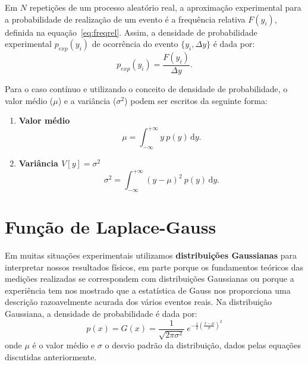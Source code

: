 Em $N$ repetições de um processo aleatório real, a aproximação experimental para a probabilidade de realização de um evento é a frequência relativa $F(y_i)$, definida na equação~\ref{eq:freqrel}.  Assim, a densidade de probabilidade experimental $p_{exp}(y_i)$ de ocorrência do evento $\{y_i, \Delta y \}$ é dada por:  
\begin{equation}
p_{exp}(y_i) = \frac{F(y_i)}{\Delta y}.
\end{equation}
\noindent

Para o caso contínuo e utilizando o conceito de densidade de probabilidade, o valor médio ($\mu$) e a variância ($\sigma^2$) podem ser escritos da seguinte forma: 

\begin{enumerate}
\item {\bf Valor médio}
\begin{equation}
\mu = \int_{-\infty}^{+\infty} \! y~p(y) \, \mathrm{d}y. 
\end{equation}
\noindent

\item {\bf Variância $V[y] = \sigma^2$}
\begin{equation}
\sigma^2 =\int_{-\infty}^{+\infty} \! (y-\mu)^2~p(y) \, \mathrm{d}y. 
\end{equation}
\end{enumerate}



\section*{Função de Laplace-Gauss}

Em muitas situações experimentais utilizamos {\bf distribuições Gaussianas} para interpretar nossos resultados físicos, em parte porque os fundamentos teóricos das medições realizadas se correspondem com distribuições Gaussianas ou porque a experiência tem nos mostrado que a estatística de Gauss nos proporciona uma descrição razoavelmente acurada dos vários eventos reais. Na distribuição Gaussiana, a densidade de probabilidade é dada por:
\begin{equation}
p(x) = G(x) = \frac{1}{\sqrt{2 \pi \sigma^2}}~e^{-\frac{1}{2}\left(\frac{x - \mu}{\sigma}\right)^2}
\label{eq:gauss}
\end{equation}
\noindent
onde $\mu $ é o valor médio e $\sigma$ o desvio padrão da distribuição, dados pelas equações discutidas anteriormente.

